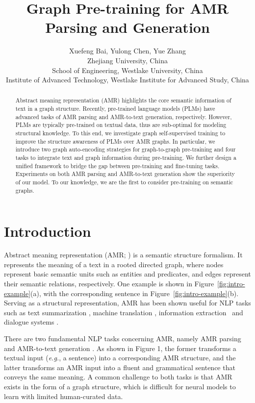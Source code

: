 \documentclass[11pt]{article}
\title{Graph Pre-training for {AMR} Parsing and Generation}
\author{
 Xuefeng Bai\hspace{0.5mm}, 
 Yulong Chen\hspace{0.5mm}, 
 Yue Zhang\hspace{0.2mm}\hspace{1.5mm} \\
  Zhejiang University, China\\
  School of Engineering, Westlake University, China\\
  Institute of Advanced Technology, Westlake Institute for Advanced Study, China
}
\begin{document}
\maketitle
\begin{abstract}
Abstract meaning representation (AMR) highlights the core semantic information of text in a graph structure.
Recently, pre-trained language models (PLMs) have advanced tasks of AMR parsing and AMR-to-text generation, respectively.
However, PLMs are typically pre-trained on textual data, thus are sub-optimal for modeling structural knowledge.
To this end, we investigate graph self-supervised training to improve the structure awareness of PLMs over AMR graphs.
In particular, we introduce two graph auto-encoding strategies for graph-to-graph pre-training and four tasks to integrate text and graph information during pre-training.
We further design a unified framework to bridge the gap between pre-training and fine-tuning tasks.
Experiments on both AMR parsing and AMR-to-text generation show the superiority of our model.
To our knowledge, we are the first to consider pre-training on semantic graphs.

\end{abstract}

\section{Introduction}
Abstract meaning representation (AMR; \citet{banarescu2013abstract}) is a semantic structure formalism. 
It represents the meaning of a text in a rooted directed graph, where nodes represent basic semantic units such as entities and predicates, and edges represent their semantic relations, respectively.
One example is shown in Figure~\ref{fig:intro-example}(a), with the corresponding sentence in Figure~\ref{fig:intro-example}(b). Serving as a structural representation, AMR has been shown useful for NLP tasks such as text summarization \cite{liu-etal-2015-toward,liao2018abstract,chen-etal-2021-dialogsum}, machine translation \cite{song2019semantic}, information extraction~\cite{huang-etal-2016-liberal,zhang-ji-2021-abstract} and dialogue systems \cite{bai-etal-2021-semantic}.

There are two fundamental NLP tasks concerning AMR, namely AMR parsing \cite{flanigan-etal-2014-discriminative,konstas2017neural,TitovL18,guo-lu-2018-better,zhang-etal-2019-amr,cai-lam-2020-amr,Bevilacqua_Blloshmi_Navigli_2021} and AMR-to-text generation \cite{konstas2017neural,song2018graph,zhu2019modeling,zhao-etal-2020-line,bai-etal-2020-online,ribeiro-etal-2021-investigating}.
As shown in Figure 1, the former transforms a textual input (\emph{e.g.}, a sentence) into a corresponding AMR structure, and the latter transforms an AMR input into a fluent and grammatical sentence that conveys the same meaning. A common challenge to both tasks is that AMR exists in the form of a graph structure, which is difficult for neural models to learn with limited human-curated data.
\end{document}
